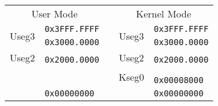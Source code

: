 {
\centering
\begin{tabular}{|c|l c|c|l}
\multicolumn{2}{c}{User Mode} & \multicolumn{1}{l}{} & \multicolumn{2}{c}{Kernel Mode}\\
\cline{1-1}\cline{4-4}
\multirow{2}{*}{Useg3} & \texttt{0x3FFF.FFFF} & & \multirow{2}{*}{Useg3} & \texttt{0x3FFF.FFFF} \\
 & \texttt{0x3000.0000} & & & \texttt{0x3000.0000} \\
\cline{1-1}\cline{4-4}
\multirow{2}{*}{Useg2} & & & \multirow{2}{*}{Useg2} & \\
 & \texttt{0x2000.0000} & \hspace{20px} & & \texttt{0x2000.0000} \\
\cline{1-1}\cline{4-4}
\cellcolor{gray} & & & \multirow{3}{*}{Kseg0} & \\
\cellcolor{gray} & & & & \\
\cellcolor{gray} & & & & \texttt{0x00008000} \\
\cline{4-4}
\cellcolor{gray}\hspace{50px} & \texttt{0x00000000} & & \hspace{50px} & \texttt{0x00000000} \\
\cline{1-1}\cline{4-4}
\end{tabular}
}